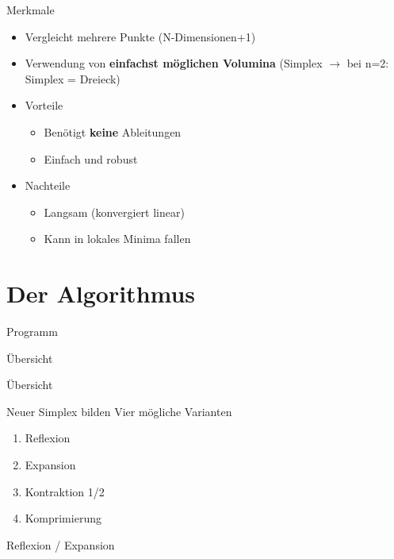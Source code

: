 \documentclass[\outputformat]{beamer}
\begin{document}
\begin{frame}{Merkmale}
\begin{itemize}
	\item Vergleicht mehrere Punkte (N-Dimensionen+1)
	\item Verwendung von \textbf{einfachst möglichen Volumina} (Simplex $\rightarrow$ bei n=2: Simplex = Dreieck)
	\item Vorteile
	\begin{itemize}
		\item Benötigt \textbf{keine} Ableitungen
		\item Einfach und robust
	\end{itemize}
	\item Nachteile
	\begin{itemize}
		\item Langsam (konvergiert linear)
		\item Kann in lokales Minima fallen
	\end{itemize} 
\end{itemize}
\end{frame}

\section{Der Algorithmus} 
\begin{frame}{Programm}\tableofcontents[currentsection]\end{frame}

\begin{frame}{Übersicht}
\newcommand{\highlight}{white}

\end{frame}
\begin{frame}{Übersicht}
\newcommand{\highlight}{green}

\end{frame}

\begin{frame}{Neuer Simplex bilden}
Vier mögliche Varianten
\begin{enumerate}
\item Reflexion
\item Expansion
\item Kontraktion 1/2
\item Komprimierung
\end{enumerate}
\end{frame}

\begin{frame}{Reflexion / Expansion}

\end{frame}
\end{document}
